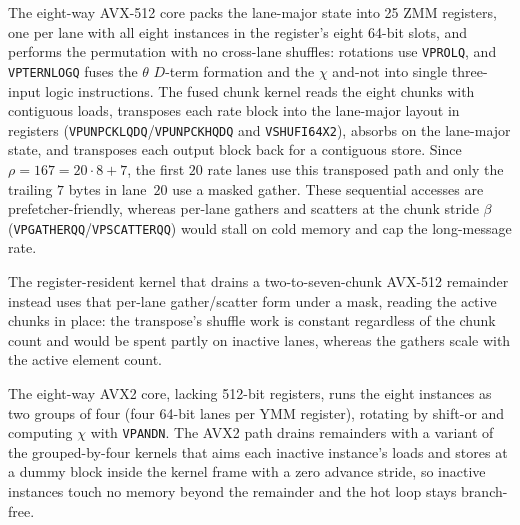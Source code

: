 The eight-way AVX-512 core packs the lane-major state into 25 ZMM registers,
one per lane with all eight instances in the register's eight 64-bit slots, and
performs the permutation with no cross-lane shuffles: rotations use
\texttt{VPROLQ}, and \texttt{VPTERNLOGQ} fuses the $\theta$ $D$-term formation
and the $\chi$ \mbox{and-not} into single three-input logic instructions. The
fused chunk kernel reads the eight chunks with contiguous loads, transposes each
rate block into the lane-major layout in registers
(\texttt{VPUNPCKLQDQ}/\texttt{VPUNPCKHQDQ} and \texttt{VSHUFI64X2}), absorbs on
the lane-major state, and transposes each output block back for a contiguous
store. Since $\rho = 167 = 20 \cdot 8 + 7$, the first $20$ rate lanes use this
transposed path and only the trailing $7$ bytes in lane~$20$ use a masked
gather. These sequential accesses are prefetcher-friendly, whereas per-lane
gathers and scatters at the chunk stride $\beta$
(\texttt{VPGATHERQQ}/\texttt{VPSCATTERQQ}) would stall on cold memory and cap
the long-message rate.

The register-resident kernel that drains a two-to-seven-chunk AVX-512 remainder
instead uses that per-lane gather/scatter form under a mask, reading the active
chunks in place: the transpose's shuffle work is constant regardless of the
chunk count and would be spent partly on inactive lanes, whereas the gathers
scale with the active element count.

The eight-way AVX2 core, lacking 512-bit registers, runs the eight instances as
two groups of four (four 64-bit lanes per YMM register), rotating by shift-or
and computing $\chi$ with \texttt{VPANDN}. The AVX2 path drains remainders with
a variant of the grouped-by-four kernels that aims each inactive instance's
loads and stores at a dummy block inside the kernel frame with a zero advance
stride, so inactive instances touch no memory beyond the remainder and the hot
loop stays branch-free.

